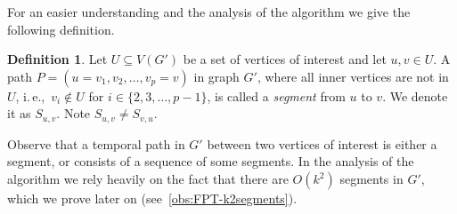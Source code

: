\documentclass[11pt,a4paper]{article}
\theoremstyle{remark}
\theoremstyle{definition}
\newtheorem{definition}[theorem]{Definition}
\newcommand{\ie}{i.\,e.,\ }
\begin{document}
For an easier understanding and the analysis of the algorithm we give the following definition.
\begin{definition}
    Let $U \subseteq V(G')$ be a set of vertices of interest and let $u,v \in U$.
    A path $P = (u=v_1,v_2, \dots, v_p = v)$  in graph $G'$, where all inner vertices are not in $U$, \ie $v_i \notin U$ for $i \in \{ 2, 3, \dots, p-1\}$,
    is called a \emph{segment} from $u$ to $v$. We denote it as $S_{u,v}$.
    Note $S_{u,v} \neq S_{v,u}$.
\end{definition}
Observe that a temporal path in $G'$ between two vertices of interest is either a segment, or consists of a sequence of some segments.
In the analysis of the algorithm we rely heavily on the fact that there are $O(k^2)$ segments in $G'$, 
which we prove later on (see~\cref{obs:FPT-k2segments}).
\end{document}

